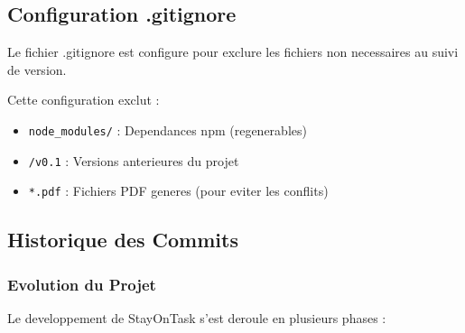 \documentclass[12pt,a4paper]{article}
\begin{document}
\subsection{Configuration .gitignore}

Le fichier .gitignore est configure pour exclure les fichiers non necessaires au suivi de version.

Cette configuration exclut :
\begin{itemize}
    \item \texttt{node\_modules/} : Dependances npm (regenerables)
    \item \texttt{/v0.1} : Versions anterieures du projet
    \item \texttt{*.pdf} : Fichiers PDF generes (pour eviter les conflits)
\end{itemize}

\subsection{Historique des Commits}

\subsubsection{Evolution du Projet}

Le developpement de StayOnTask s'est deroule en plusieurs phases :
\end{document}
